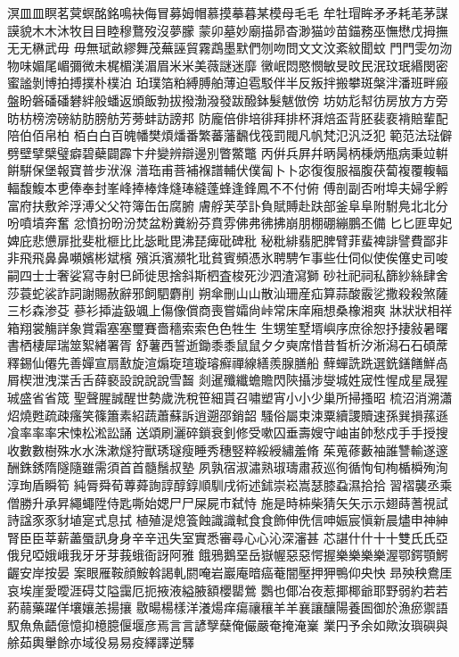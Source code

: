 溟⽫皿瞑茗蓂螟酩銘鳴袂侮冒募姆帽慕摸摹暮某模母⽑毛
牟牡瑁眸⽭矛耗芼茅謀謨貌⽊木沐牧⽬目睦穆鶩歿沒夢朦
蒙卯墓妙廟描昴杳渺猫竗苗錨務巫憮懋戊拇撫⽆无楙武⽏
毋無珷畝繆舞茂蕪誣貿霧鵡墨默們刎吻問⽂文汶紊紋聞蚊
⾨門雯勿沕物味媚尾嵋彌微未梶楣渼湄眉⽶米美薇謎迷靡
黴岷悶愍憫敏旻旼民泯玟珉緡閔密蜜謐剝博拍搏撲朴樸泊
珀璞箔粕縛膊舶薄迫雹駁伴半反叛拌搬攀斑槃泮潘班畔瘢
盤盼磐磻磻礬絆般蟠返頒飯勃拔撥渤潑發跋醱鉢髮魃倣傍
坊妨尨幇彷房放⽅方旁昉枋榜滂磅紡肪膀舫芳蒡蚌訪謗邦
防龐倍俳培徘拜排杯湃焙盃背胚裴裵褙賠輩配陪伯佰帛柏
栢⽩白百魄幡樊煩燔番繁蕃藩飜伐筏罰閥凡帆梵氾汎泛犯
範范法琺僻劈壁擘檗璧癖碧蘗闢霹卞弁變辨辯邊別瞥鱉鼈
丙倂兵屛幷昞昺柄棅炳甁病秉竝輧餠騈保堡報寶普步洑湺
潽珤甫菩補褓譜輔伏僕匐⼘卜宓復復服福腹茯蔔複覆輹輻
輻馥鰒本乶俸奉封峯峰捧棒烽熢琫縫蓬蜂逢鋒鳳不不付俯
傅剖副否咐埠夫婦孚孵富府扶敷斧浮溥⽗父符簿⽸缶腐腑
膚艀芙莩訃負賦賻赴趺部釜⾩阜附駙鳧北北分吩噴墳奔奮
忿憤扮昐汾焚盆粉糞紛芬賁雰佛弗彿拂崩朋棚硼繃鵬丕備
⼔匕匪卑妃婢庇悲憊扉批斐枇榧⽐比毖毗毘沸琵痺砒碑秕
秘粃緋翡肥脾臂菲蜚裨誹譬費鄙⾮非⾶飛⿐鼻嚬嬪彬斌檳
殯浜濱瀕牝玭貧賓頻憑氷聘騁乍事些仕伺似使俟僿史司唆
嗣四⼠士奢娑寫寺射巳師徙思捨斜斯柶査梭死沙泗渣瀉獅
砂社祀祠私篩紗絲肆舍莎蓑蛇裟詐詞謝賜赦辭邪飼駟麝削
朔傘刪⼭山散汕珊産疝算蒜酸霰乷撒殺殺煞薩三杉森渗芟
蔘衫揷澁鈒颯上傷像償商喪嘗孀尙峠常床庠廂想桑橡湘爽
牀狀狀相祥箱翔裳觴詳象賞霜塞塞璽賽嗇穡索索⾊色牲⽣
生甥笙墅壻嶼序庶徐恕抒捿敍暑曙書栖棲犀瑞筮絮緖署胥
舒薯西誓逝鋤⿉黍⿏鼠⼣夕奭席惜昔晳析汐淅潟⽯石碩蓆
釋錫仙僊先善嬋宣扇敾旋渲煽琁瑄璇璿癬禪線繕羨腺膳船
蘚蟬詵跣選銑鐥饍鮮卨屑楔泄洩渫⾆舌薛褻設說說說雪齧
剡暹殲纖蟾贍閃陝攝涉燮城姓宬性惺成星晟猩珹盛省省筬
聖聲腥誠醒世勢歲洗稅笹細貰召嘯塑宵⼩小少巢所掃搔昭
梳沼消溯瀟炤燒甦疏疎瘙笑篠簫素紹蔬蕭蘇訴逍遡邵銷韶
騷俗屬束涑粟續謖贖速孫巽損蓀遜飡率率率宋悚松淞訟誦
送頌刷灑碎鎖衰釗修受嗽囚垂壽嫂守岫峀帥愁戍⼿手授搜
收數數樹殊⽔水洙漱燧狩獸琇璲瘦睡秀穗竪粹綏綬繡羞脩
茱蒐蓚藪袖誰讐輸遂邃酬銖銹隋隧隨雖需須⾸首髓鬚叔塾
夙孰宿淑潚熟琡璹肅菽巡徇循恂旬栒楯橓殉洵淳珣盾瞬筍
純脣舜荀蓴蕣詢諄醇錞順馴戌術述鉥崇崧嵩瑟膝蝨濕拾拾
習褶襲丞乘僧勝升承昇繩蠅陞侍匙嘶始媤⼫尸屎屍市弑恃
施是時枾柴猜⽮矢⽰示翅蒔蓍視試詩諡⾗豕豺埴寔式息拭
植殖湜熄篒蝕識識軾⾷食飾伸侁信呻娠宸愼新晨燼申神紳
腎⾂臣莘薪藎蜃訊⾝身⾟辛迅失室實悉審尋⼼心沁深瀋甚
芯諶什什⼗十雙⽒氏亞俄兒啞娥峨我⽛牙芽莪蛾衙訝阿雅
餓鴉鵝堊岳嶽幄惡惡愕握樂樂樂樂渥鄂鍔顎鰐齷安岸按晏
案眼雁鞍顔鮟斡謁軋閼唵岩巖庵暗癌菴闇壓押狎鴨仰央怏
昻殃秧鴦厓哀埃崖愛曖涯碍艾隘靄厄扼掖液縊腋額櫻罌鶯
鸚也倻冶夜惹揶椰爺耶野弱約若若葯蒻藥躍佯壤孃恙揚攘
敭暘楊樣洋瀁煬痒瘍禳穰⽺羊襄讓釀陽養圄御於漁瘀禦語
馭⿂魚齬億憶抑檍臆偃堰彦焉⾔言諺孼蘖俺儼嚴奄掩淹嶪
業円予余如歟汝璵礖與艅茹輿轝餘亦域役易易疫繹譯逆驛
